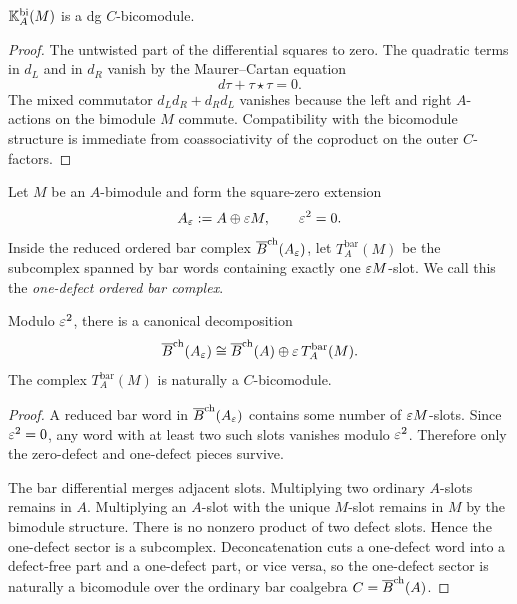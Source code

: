 \begin{lemma}[\ClaimStatusProvedHere]
\label{lem:Kbi-dg}
$\mathbb{K}_A^{\mathrm{bi}}(M)$ is a dg $C$-bicomodule.
\end{lemma}

\begin{proof}
The untwisted part of the differential squares to zero. The quadratic terms in $d_L$ and in $d_R$
vanish by the Maurer--Cartan equation
\[
d\tau+\tau\star\tau=0.
\]
The mixed commutator $d_Ld_R+d_Rd_L$ vanishes because the left and right $A$-actions on the
bimodule $M$ commute. Compatibility with the bicomodule structure is immediate from coassociativity
of the coproduct on the outer $C$-factors.
\end{proof}

\begin{definition}
Let $M$ be an $A$-bimodule and form the square-zero extension
\[
A_\varepsilon:=A\oplus \varepsilon M,\qquad \varepsilon^2=0.
\]
Inside the reduced ordered bar complex $\overline{B}^{\mathrm{ch}}(A_\varepsilon)$, let $T_A^{\mathrm{bar}}(M)$ be the
subcomplex spanned by bar words containing exactly one $\varepsilon M$-slot.
We call this the \emph{one-defect ordered bar complex}.
\end{definition}

\begin{proposition}[\ClaimStatusProvedHere]
\label{prop:one-defect}
Modulo $\varepsilon^2$, there is a canonical decomposition
\[
\overline{B}^{\mathrm{ch}}(A_\varepsilon)\cong \overline{B}^{\mathrm{ch}}(A)\oplus \varepsilon\, T_A^{\mathrm{bar}}(M).
\]
The complex $T_A^{\mathrm{bar}}(M)$ is naturally a $C$-bicomodule.
\end{proposition}

\begin{proof}
A reduced bar word in $\overline{B}^{\mathrm{ch}}(A_\varepsilon)$ contains some number of $\varepsilon M$-slots.
Since $\varepsilon^2=0$, any word with at least two such slots vanishes modulo $\varepsilon^2$.
Therefore only the zero-defect and one-defect pieces survive.

The bar differential merges adjacent slots. Multiplying two ordinary $A$-slots remains in $A$.
Multiplying an $A$-slot with the unique $M$-slot remains in $M$ by the bimodule structure.
There is no nonzero product of two defect slots. Hence the one-defect sector is a subcomplex.
Deconcatenation cuts a one-defect word into a defect-free part and a one-defect part, or vice versa,
so the one-defect sector is naturally a bicomodule over the ordinary bar coalgebra $C=\overline{B}^{\mathrm{ch}}(A)$.
\end{proof}


